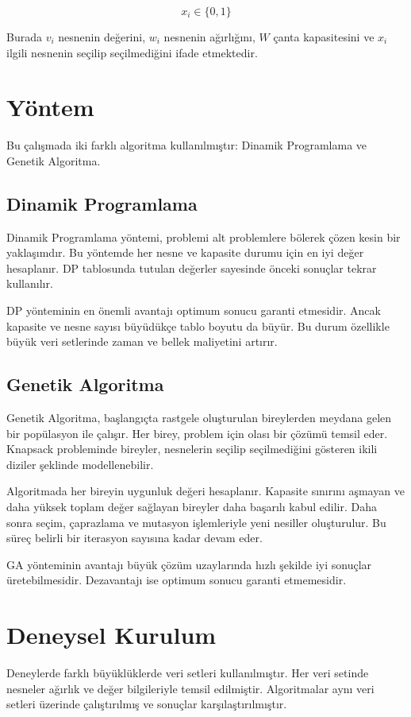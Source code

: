 \documentclass[conference]{IEEEtran}
\begin{document}
\begin{equation}
x_i \in \{0,1\}
\end{equation}

Burada $v_i$ nesnenin değerini, $w_i$ nesnenin ağırlığını, $W$ çanta kapasitesini ve $x_i$ ilgili nesnenin seçilip seçilmediğini ifade etmektedir.

\section{Yöntem}
Bu çalışmada iki farklı algoritma kullanılmıştır: Dinamik Programlama ve Genetik Algoritma.

\subsection{Dinamik Programlama}
Dinamik Programlama yöntemi, problemi alt problemlere bölerek çözen kesin bir yaklaşımdır. Bu yöntemde her nesne ve kapasite durumu için en iyi değer hesaplanır. DP tablosunda tutulan değerler sayesinde önceki sonuçlar tekrar kullanılır.

DP yönteminin en önemli avantajı optimum sonucu garanti etmesidir. Ancak kapasite ve nesne sayısı büyüdükçe tablo boyutu da büyür. Bu durum özellikle büyük veri setlerinde zaman ve bellek maliyetini artırır.

\subsection{Genetik Algoritma}
Genetik Algoritma, başlangıçta rastgele oluşturulan bireylerden meydana gelen bir popülasyon ile çalışır. Her birey, problem için olası bir çözümü temsil eder. Knapsack probleminde bireyler, nesnelerin seçilip seçilmediğini gösteren ikili diziler şeklinde modellenebilir.

Algoritmada her bireyin uygunluk değeri hesaplanır. Kapasite sınırını aşmayan ve daha yüksek toplam değer sağlayan bireyler daha başarılı kabul edilir. Daha sonra seçim, çaprazlama ve mutasyon işlemleriyle yeni nesiller oluşturulur. Bu süreç belirli bir iterasyon sayısına kadar devam eder.

GA yönteminin avantajı büyük çözüm uzaylarında hızlı şekilde iyi sonuçlar üretebilmesidir. Dezavantajı ise optimum sonucu garanti etmemesidir.

\section{Deneysel Kurulum}
Deneylerde farklı büyüklüklerde veri setleri kullanılmıştır. Her veri setinde nesneler ağırlık ve değer bilgileriyle temsil edilmiştir. Algoritmalar aynı veri setleri üzerinde çalıştırılmış ve sonuçlar karşılaştırılmıştır.
\end{document}
